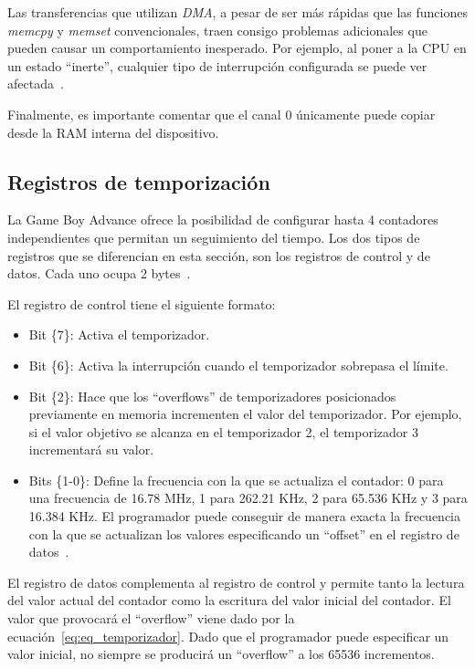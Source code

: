 {Las transferencias que utilizan \textit{DMA}, a pesar de ser más rápidas que las funciones \textit{memcpy} y \textit{memset} convencionales, traen consigo problemas adicionales que pueden causar un comportamiento inesperado. Por ejemplo, al poner a la CPU en un estado ``inerte'', cualquier tipo de interrupción configurada se puede ver afectada~\cite{bib:tonc}.

Finalmente, es importante comentar que el canal 0 únicamente puede copiar desde la RAM interna del dispositivo.

\subsection{Registros de temporización}
La Game Boy Advance ofrece la posibilidad de configurar hasta 4 contadores independientes que permitan un seguimiento del tiempo. Los dos tipos de registros que se diferencian en esta sección, son los registros de control y de datos. Cada uno ocupa 2 bytes~\cite{bib:tonc}. 

El registro de control tiene el siguiente formato:

\begin{itemize}
	\item Bit \{7\}: Activa el temporizador.
	\item Bit \{6\}: Activa la interrupción cuando el temporizador sobrepasa el límite. 
	\item Bit \{2\}: Hace que los ``overflows'' de temporizadores posicionados previamente en memoria incrementen el valor del temporizador. Por ejemplo, si el valor objetivo se alcanza en el temporizador 2, el temporizador 3 incrementará su valor. 
	\item Bits \{1-0\}: Define la frecuencia con la que se actualiza el contador: 0 para una frecuencia de 16.78 MHz, 1 para 262.21 KHz, 2 para 65.536 KHz y 3 para 16.384 KHz. El programador puede conseguir de manera exacta la frecuencia con la que se actualizan los valores especificando un ``offset'' en el registro de datos~\cite{bib:tonc}.
\end{itemize}

El registro de datos complementa al registro de control y permite tanto la lectura del valor actual del contador como la escritura del valor inicial del contador. El valor que provocará el ``overflow'' viene dado por la ecuación~\ref{eq:eq_temporizador}. Dado que el programador puede especificar un valor inicial, no siempre se producirá un ``overflow'' a los 65536 incrementos.

}
